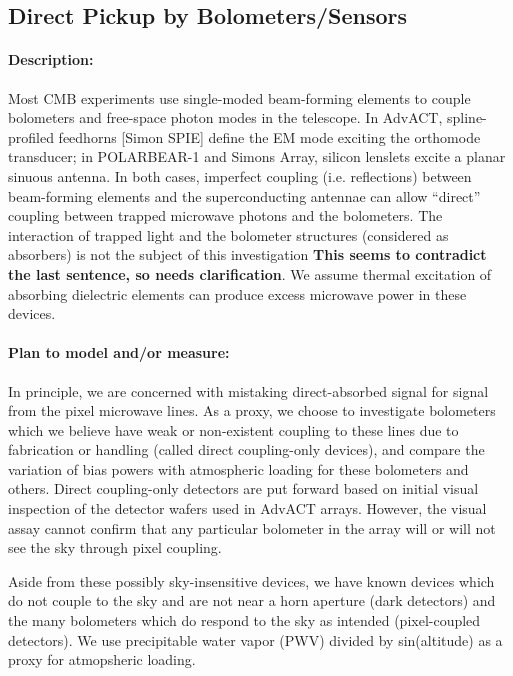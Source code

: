 \subsection{Direct Pickup by Bolometers/Sensors}

\paragraph{Description:}
Most CMB experiments use single-moded beam-forming elements to couple bolometers and free-space photon modes in the telescope. In AdvACT, spline-profiled feedhorns [Simon SPIE] \cite{Simon} define the EM mode exciting the orthomode transducer; in POLARBEAR-1 and Simons Array, silicon lenslets excite a planar sinuous antenna. In both cases, imperfect coupling (i.e. reflections) between beam-forming elements and the superconducting antennae can allow ``direct'' coupling between trapped microwave photons and the bolometers. The interaction of trapped light and the bolometer structures (considered as absorbers) is not the subject of this investigation \textbf{This seems to contradict the last sentence, so needs clarification}. We assume thermal excitation of absorbing dielectric elements can produce excess microwave power in these devices.

\paragraph{Plan to model and/or measure:}
In principle, we are concerned with mistaking direct-absorbed signal for signal from the pixel microwave lines. As a proxy, we choose to investigate bolometers which we believe have weak or non-existent coupling to these lines due to fabrication or handling (called direct coupling-only devices), and compare the variation of bias powers with atmospheric loading for these bolometers and others. Direct coupling-only detectors are put forward based on initial visual inspection of the detector wafers used in AdvACT arrays. However, the visual assay cannot confirm that any particular bolometer in the array will or will not see the sky through pixel coupling. 

Aside from these possibly sky-insensitive devices, we have known devices which do not couple to the sky and are not near a horn aperture (dark detectors) and the many bolometers which do respond to the sky as intended (pixel-coupled detectors). We use precipitable water vapor (PWV) divided by sin(altitude) as a proxy for atmopsheric loading.

